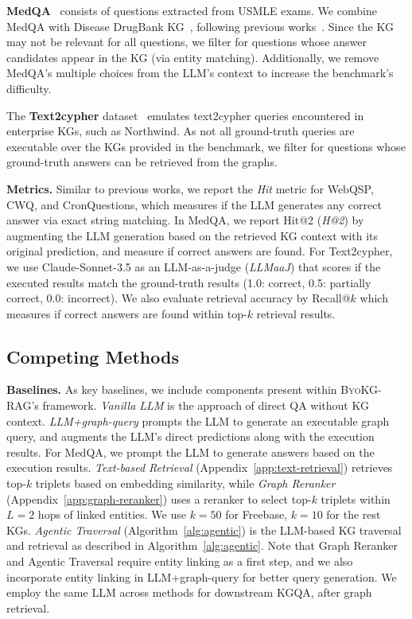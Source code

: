 \documentclass[11pt]{article}
\newcommand{\byokg}{\textsc{ByoKG-RAG}\xspace}
\begin{document}
\textbf{MedQA}~\citep{jin2021disease} consists of questions extracted from USMLE exams. We combine MedQA with Disease DrugBank KG~\citep{wishart2018drugbank}, following previous works~\citep{yasunaga2021qagnn}. Since the KG may not be relevant for all questions, we filter for questions whose answer candidates appear in the KG (via entity matching). Additionally, we remove MedQA's multiple choices from the LLM's context to increase the benchmark's difficulty.


The \textbf{Text2cypher} dataset~\citep{ozsoy2024text2cypher} emulates text2cypher queries encountered in enterprise KGs, such as Northwind. As not all ground-truth queries are executable over the KGs provided in the benchmark, we filter for questions whose ground-truth answers can be retrieved from the graphs. %





\textbf{Metrics.} Similar to previous works, we report the \textit{Hit} metric for WebQSP, CWQ, and CronQuestions, which measures if the LLM generates any correct answer via exact string matching. In MedQA, we report Hit@2 (\textit{H@2}) by augmenting the LLM generation based on the retrieved KG context with its original prediction, and measure if correct answers are found. For Text2cypher, we use Claude-Sonnet-3.5 as an LLM-as-a-judge (\textit{LLMaaJ}) that scores if the executed results match the ground-truth results (1.0: correct, 0.5: partially correct, 0.0: incorrect). We also evaluate retrieval accuracy by Recall@$k$ which measures if correct answers are found within top-$k$ retrieval results.

\subsection{Competing Methods}

\textbf{Baselines.}  As key baselines, we include components present within \byokg's framework. \textit{Vanilla LLM} is the approach of direct QA without KG context. \textit{LLM+graph-query} prompts the LLM to generate an executable graph query, and augments the LLM's direct predictions along with the execution results. For MedQA, we prompt the LLM to generate answers based on the execution results. \textit{Text-based Retrieval} (Appendix~\ref{app:text-retrieval}) retrieves top-$k$ triplets based on embedding similarity, while \textit{Graph Reranker} (Appendix~\ref{app:graph-reranker}) uses a reranker to select top-$k$ triplets within $L=2$ hops of linked entities. We use $k=50$ for Freebase, $k=10$ for the rest KGs.  \textit{Agentic Traversal} (Algorithm~\ref{alg:agentic}) is the LLM-based KG traversal and retrieval as described in Algorithm~\ref{alg:agentic}. Note that Graph Reranker and Agentic Traversal require entity linking as a first step, and we also incorporate entity linking in LLM+graph-query for better query generation.  We employ the same LLM across methods for downstream KGQA, after graph retrieval. 
\end{document}
